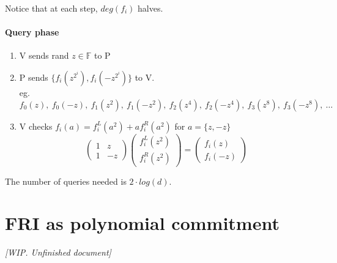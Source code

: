 \documentclass{article}
\theoremstyle{definition}
\begin{document}
Notice that at each step, $deg(f_i)$ halves.

\paragraph{Query phase}

\begin{enumerate}
	\item V sends rand $z \in \mathbb{F}$ to P
	\item P sends $\{ f_i(z^{2^i}), f_i(- z^{2^i}) \}$ to V.\\
		{\scriptsize eg. $f_0(z),~ f_0(-z),~ f_1(z^2),~ f_1(-z^2),~ f_2(z^4),~ f_2(-z^4),~ f_3(z^8),~ f_3(-z^8),~ \ldots$}
	\item V checks $f_i(a)=f_i^L(a^2) + a f_i^R(a^2)$ for $a=\{z, -z\}$
		$$
		\begin{pmatrix}
			1 & z\\
			1 & -z
		\end{pmatrix}
		\begin{pmatrix}
			f_i^L(z^2)\\
			f_i^R(z^2)
		\end{pmatrix}
		=
		\begin{pmatrix}
			f_i(z)\\
			f_i(-z)
		\end{pmatrix}
		$$
\end{enumerate}

The number of queries needed is $2 \cdot log(d)$.

\section{FRI as polynomial commitment}
\emph{[WIP. Unfinished document]}




\end{document}
